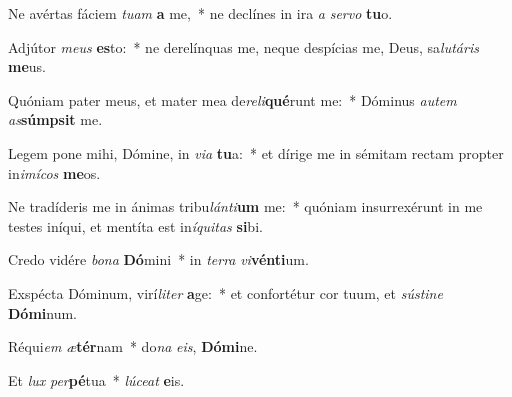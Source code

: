 \item Ne avértas fáciem \textit{tu}\textit{am} \textbf{a} me,~* ne declínes in ira \textit{a} \textit{ser}\textit{vo} \textbf{tu}o.

\item Adjútor \textit{me}\textit{us} \textbf{es}to:~* ne derelínquas me, neque despícias me, Deus, sa\textit{lu}\textit{tá}\textit{ris} \textbf{me}us.

\item Quóniam pater meus, et mater mea de\textit{re}\textit{li}\textbf{qué}runt me:~* Dóminus \textit{au}\textit{tem} \textit{as}\textbf{súmp}\textbf{sit} me.

\item Legem pone mihi, Dómine, in \textit{vi}\textit{a} \textbf{tu}a:~* et dírige me in sémitam rectam propter in\textit{i}\textit{mí}\textit{cos} \textbf{me}os.

\item Ne tradíderis me in ánimas tribu\textit{lán}\textit{ti}\textbf{um} me:~* quóniam insurrexérunt in me testes iníqui, et mentíta est in\textit{í}\textit{qui}\textit{tas} \textbf{si}bi.

\item Credo vidére \textit{bo}\textit{na} \textbf{Dó}mini~* in \textit{ter}\textit{ra} \textit{vi}\textbf{vén}\textbf{ti}um.

\item Exspécta Dóminum, virí\textit{li}\textit{ter} \textbf{a}ge:~* et confortétur cor tuum, et \textit{sús}\textit{ti}\textit{ne} \textbf{Dó}\textbf{mi}num.

\item Réqui\textit{em} \textit{æ}\textbf{tér}nam~* do\textit{na} \textit{e}\textit{is}, \textbf{Dó}\textbf{mi}ne.

\item Et \textit{lux} \textit{per}\textbf{pé}tua~* \textit{lú}\textit{ce}\textit{at} \textbf{e}is.